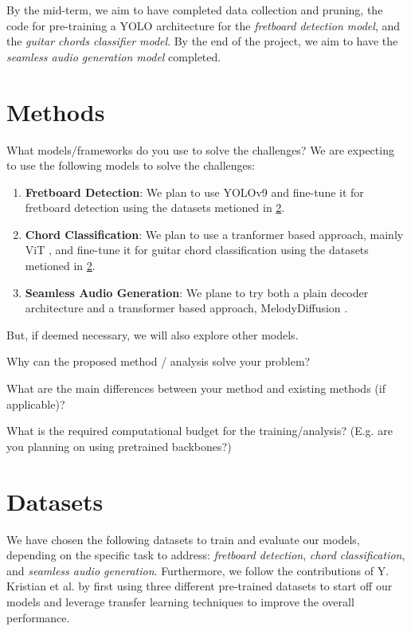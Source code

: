 \documentclass[10pt,twocolumn,letterpaper]{article}
\begin{document}
By the mid-term, we aim to have completed data collection and pruning, the code for pre-training a YOLO architecture for the \emph{fretboard detection model}, and the \emph{guitar chords classifier model}. By the end of the project, we aim to have the \emph{seamless audio generation model} completed.

\section{Methods}\label{sec:methods}

What models/frameworks do you use to solve the challenges?
We are expecting to use the following models to solve the challenges:
\begin{enumerate}
    \item \textbf{Fretboard Detection}: We plan to use YOLOv9 \cite{wang2024yolov9} and fine-tune it for fretboard detection using the datasets metioned in \cref{sec:datasets}.
    \item \textbf{Chord Classification}: We plan to use a tranformer based approach, mainly ViT \cite{dosovitskiy2020image}, and fine-tune it for guitar chord classification using the datasets metioned in \cref{sec:datasets}.
    \item \textbf{Seamless Audio Generation}: We plane to try both a plain decoder architecture and a transformer based approach, MelodyDiffusion \cite{math11081915}.
\end{enumerate}

But, if deemed necessary, we will also explore other models.

Why can the proposed method / analysis solve your problem?

What are the main differences between your method and existing methods (if applicable)?

What is the required computational budget for the training/analysis? (E.g. are you planning on using pretrained backbones?)

\section{Datasets}\label{sec:datasets}

We have chosen the following datasets to train and evaluate our models, depending on the specific task to address: \emph{fretboard detection}, \emph{chord classification}, and \emph{seamless audio generation}. Furthermore, we follow the contributions of Y. Kristian et al. \cite{Kristian_Zaman_Tenoyo_Jodhinata_2024} by first using three different pre-trained datasets to start off our models and leverage transfer learning techniques to improve the overall performance.
\end{document}
